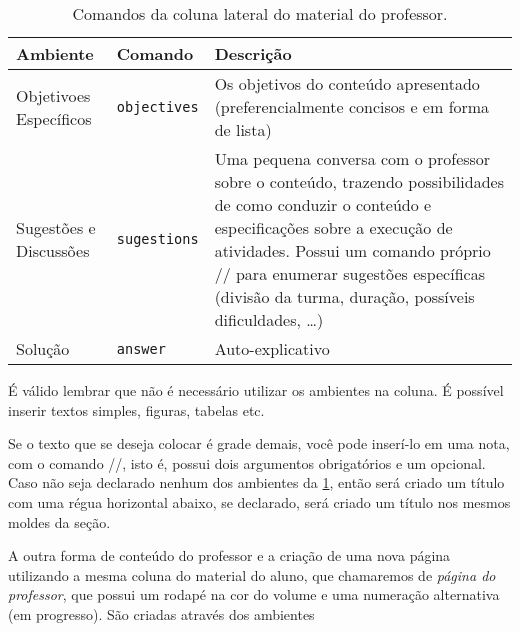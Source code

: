 \begin{table}[htp!]
	\centering\small
	\begin{tabular}{llp{.4\linewidth}}
		\toprule
		Ambiente               & Comando           & Descrição                                     \\
		\midrule
		Objetivoes Específicos & \verb|objectives| & Os objetivos do conteúdo apresentado
		(preferencialmente concisos e em forma de lista)                                           \\
		\addlinespace
		Sugestões e Discussões & \verb|sugestions| & Uma pequena conversa com o professor
		sobre o conteúdo, trazendo possibilidades de como conduzir o conteúdo e especificações
		sobre a execução de atividades. Possui um comando próprio \latexinline/\sugestion/ para
		enumerar sugestões específicas (divisão da turma, duração, possíveis dificuldades, \ldots) \\
		\addlinespace
		Solução                & \verb|answer|     & Auto-explicativo                              \\
		\bottomrule
	\end{tabular}
	\caption{Comandos da coluna lateral do material do professor.}\label{tab:teacher-ambientes}
\end{table}

É válido lembrar que não é necessário utilizar os ambientes na coluna. É possível inserir
textos simples, figuras, tabelas etc.

Se o texto que se deseja colocar é grade demais, você pode inserí-lo em
uma nota, com o comando
\latexinline//, isto é, possui
dois argumentos obrigatórios e um opcional. Caso não seja declarado
nenhum dos ambientes da \cref{tab:teacher-ambientes}, então será criado
um título com uma régua horizontal abaixo, se declarado, será criado um
título nos mesmos moldes da seção.

A outra forma de conteúdo do professor e a criação de uma nova página
utilizando a mesma coluna do material do aluno, que chamaremos de
\emph{página do professor}, que possui um rodapé na cor do volume e uma
numeração alternativa (em progresso). São criadas através dos ambientes

